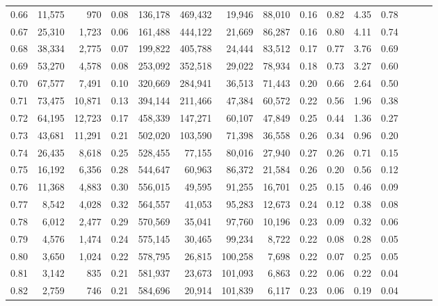 \begin{tabular}{rrrrrrrrrrrrrrr}
0.66 &  11,575 &     970 &  0.08 &  136,178 &  469,432 &   19,946 &   88,010 &  0.16 &  0.82 &  4.35 &      0.78 \\
0.67 &  25,310 &   1,723 &  0.06 &  161,488 &  444,122 &   21,669 &   86,287 &  0.16 &  0.80 &  4.11 &      0.74 \\
0.68 &  38,334 &   2,775 &  0.07 &  199,822 &  405,788 &   24,444 &   83,512 &  0.17 &  0.77 &  3.76 &      0.69 \\
0.69 &  53,270 &   4,578 &  0.08 &  253,092 &  352,518 &   29,022 &   78,934 &  0.18 &  0.73 &  3.27 &      0.60 \\
0.70 &  67,577 &   7,491 &  0.10 &  320,669 &  284,941 &   36,513 &   71,443 &  0.20 &  0.66 &  2.64 &      0.50 \\
0.71 &  73,475 &  10,871 &  0.13 &  394,144 &  211,466 &   47,384 &   60,572 &  0.22 &  0.56 &  1.96 &      0.38 \\
0.72 &  64,195 &  12,723 &  0.17 &  458,339 &  147,271 &   60,107 &   47,849 &  0.25 &  0.44 &  1.36 &      0.27 \\
0.73 &  43,681 &  11,291 &  0.21 &  502,020 &  103,590 &   71,398 &   36,558 &  0.26 &  0.34 &  0.96 &      0.20 \\
0.74 &  26,435 &   8,618 &  0.25 &  528,455 &   77,155 &   80,016 &   27,940 &  0.27 &  0.26 &  0.71 &      0.15 \\
0.75 &  16,192 &   6,356 &  0.28 &  544,647 &   60,963 &   86,372 &   21,584 &  0.26 &  0.20 &  0.56 &      0.12 \\
0.76 &  11,368 &   4,883 &  0.30 &  556,015 &   49,595 &   91,255 &   16,701 &  0.25 &  0.15 &  0.46 &      0.09 \\
0.77 &   8,542 &   4,028 &  0.32 &  564,557 &   41,053 &   95,283 &   12,673 &  0.24 &  0.12 &  0.38 &      0.08 \\
0.78 &   6,012 &   2,477 &  0.29 &  570,569 &   35,041 &   97,760 &   10,196 &  0.23 &  0.09 &  0.32 &      0.06 \\
0.79 &   4,576 &   1,474 &  0.24 &  575,145 &   30,465 &   99,234 &    8,722 &  0.22 &  0.08 &  0.28 &      0.05 \\
0.80 &   3,650 &   1,024 &  0.22 &  578,795 &   26,815 &  100,258 &    7,698 &  0.22 &  0.07 &  0.25 &      0.05 \\
0.81 &   3,142 &     835 &  0.21 &  581,937 &   23,673 &  101,093 &    6,863 &  0.22 &  0.06 &  0.22 &      0.04 \\
0.82 &   2,759 &     746 &  0.21 &  584,696 &   20,914 &  101,839 &    6,117 &  0.23 &  0.06 &  0.19 &      0.04 \\

\end{tabular}
